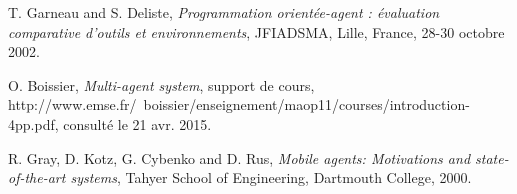 \documentclass[conference]{IEEEtran}
\begin{document}
\begin{thebibliography}{56}

T. Garneau and S. Deliste, \emph{Programmation orientée-agent : évaluation comparative d'outils et environnements}, JFIADSMA, Lille, France, 28-30 octobre 2002.

O. Boissier, \emph{Multi-agent system}, support de cours, http://www.emse.fr/~boissier/enseignement/maop11/courses/introduction-4pp.pdf, consulté le 21 avr. 2015.

R. Gray, D. Kotz, G. Cybenko and D. Rus, \emph{Mobile agents: Motivations and state-of-the-art systems}, Tahyer School of Engineering, Dartmouth College, 2000.

\end{thebibliography}

\end{document}
